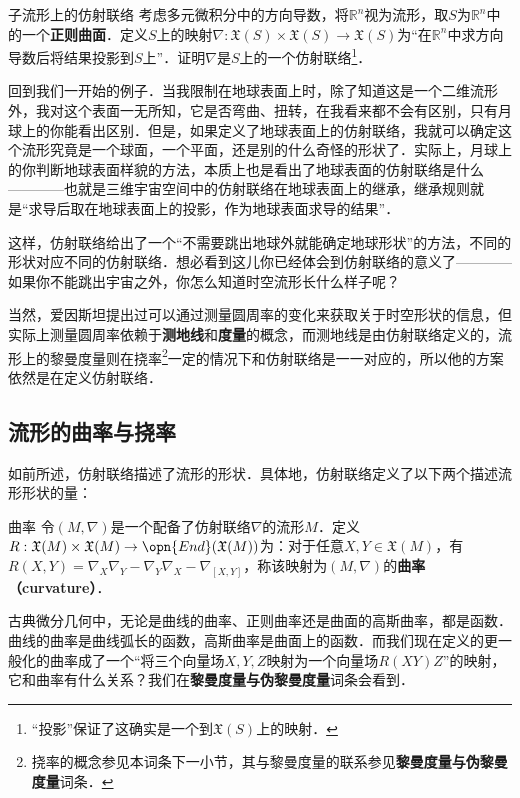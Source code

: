 \begin{exercise}{子流形上的仿射联络}
考虑多元微积分中的方向导数，将$\mathbb{R}^n$视为流形，取$S$为$\mathbb{R}^n$中的一个\textbf{正则曲面}．定义$S$上的映射$\nabla:\mathfrak{X}(S)\times\mathfrak{X}(S)\to\mathfrak{X}(S)$为“在$\mathbb{R}^n$中求方向导数后将结果投影到$S$上”．证明$\nabla$是$S$上的一个仿射联络\footnote{“投影”保证了这确实是一个到$\mathfrak{X}(S)$上的映射．}．
\end{exercise}

回到我们一开始的例子．当我限制在地球表面上时，除了知道这是一个二维流形外，我对这个表面一无所知，它是否弯曲、扭转，在我看来都不会有区别，只有月球上的你能看出区别．但是，如果定义了地球表面上的仿射联络，我就可以确定这个流形究竟是一个球面，一个平面，还是别的什么奇怪的形状了．实际上，月球上的你判断地球表面样貌的方法，本质上也是看出了地球表面的仿射联络是什么————也就是三维宇宙空间中的仿射联络在地球表面上的继承，继承规则就是“求导后取在地球表面上的投影，作为地球表面求导的结果”．

这样，仿射联络给出了一个“不需要跳出地球外就能确定地球形状”的方法，不同的形状对应不同的仿射联络．想必看到这儿你已经体会到仿射联络的意义了————如果你不能跳出宇宙之外，你怎么知道时空流形长什么样子呢？

当然，爱因斯坦提出过可以通过测量圆周率的变化来获取关于时空形状的信息，但实际上测量圆周率依赖于\textbf{测地线}和\textbf{度量}的概念，而测地线是由仿射联络定义的，流形上的黎曼度量则在挠率\footnote{挠率的概念参见本词条下一小节，其与黎曼度量的联系参见\textbf{黎曼度量与伪黎曼度量}词条．}一定的情况下和仿射联络是一一对应的，所以他的方案依然是在定义仿射联络．

\subsection{流形的曲率与挠率}

如前所述，仿射联络描述了流形的形状．具体地，仿射联络定义了以下两个描述流形形状的量：

\begin{definition}{曲率}
令$(M, \nabla)$是一个配备了仿射联络$\nabla$的流形$M$．定义$R:\mathfrak{X}(M)\times\mathfrak{X}(M)\to\opn{End}(\mathfrak{X}(M))$为：对于任意$X, Y\in\mathfrak{X}(M)$，有$R(X, Y)=\nabla_X\nabla_Y-\nabla_Y\nabla_X-\nabla_{[X, Y]}$，称该映射为$(M, \nabla)$的\textbf{曲率（curvature）}．
\end{definition}

古典微分几何中，无论是曲线的曲率、正则曲率还是曲面的高斯曲率，都是函数．曲线的曲率是曲线弧长的函数，高斯曲率是曲面上的函数．而我们现在定义的更一般化的曲率成了一个“将三个向量场$X, Y, Z$映射为一个向量场$R(XY)Z$”的映射，它和曲率有什么关系？我们在\textbf{黎曼度量与伪黎曼度量}词条会看到．

